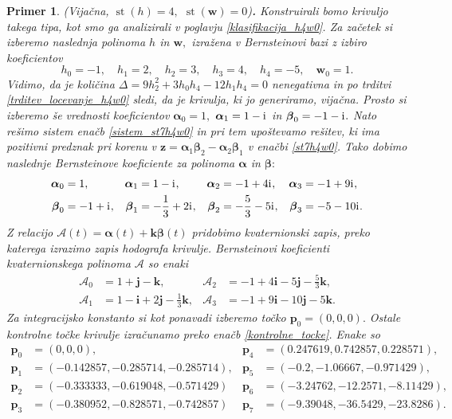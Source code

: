 \documentclass[12pt,a4paper,twoside]{article}
\newcommand{\iu}{\mathrm{i}\mkern1mu} %
\theoremstyle{definition} %
\theoremstyle{plain} %
\theoremstyle{primerstyle}
\newtheorem{primer}[definicija]{Primer}
\numberwithin{equation}{section}  %
\newcommand{\pV}{\mathbf{p}}
\newcommand{\iV}{\mathbf{i}}
\newcommand{\jV}{\mathbf{j}}
\newcommand{\kV}{\mathbf{k}}
\newcommand{\wV}{\mathbf{w}}
\newcommand{\zV}{\mathbf{z}}
\newcommand{\AQ}{\mathcal{A}}
\newcommand{\balpha}{\boldsymbol \alpha}
\newcommand{\bbeta}{\boldsymbol \beta}
\DeclareMathOperator{\st}{st}
\begin{document}
\begin{primer}
	\textnormal{ }(Vijačna, $\st(h)=4,$ $\st(\wV)=0$)\textbf{.}
	Konstruirali bomo krivuljo takega tipa, kot smo ga analizirali v poglavju \ref{klasifikacija_h4w0}. Za začetek si izberemo naslednja polinoma $h$ in $\wV,$ izražena v Bernsteinovi bazi z izbiro koeficientov
	\begin{equation*}
		h_0=-1,\quad h_1=2,\quad h_2=3,\quad h_3=4,\quad h_4=-5,\quad \wV_0=1.
	\end{equation*}
	Vidimo, da je količina $\Delta=9h_2^2+3h_0h_4-12h_1h_4=0$ nenegativna in po trditvi \ref{trditev_locevanje_h4w0} sledi, da je krivulja, ki jo generiramo, vijačna. Prosto si izberemo še vrednosti koeficientov $\balpha_0=1,$ $\balpha_1=1-\iu$ in $\bbeta_0=-1-\iu.$ Nato rešimo sistem enačb \eqref{sistem_st7h4w0} in pri tem upoštevamo rešitev, ki ima pozitivni predznak pri korenu v $\zV=\balpha_1\bbeta_2-\balpha_2\bbeta_1$ v enačbi \eqref{st7h4w0}. Tako dobimo naslednje Bernsteinove koeficiente za polinoma $\balpha$ in $\bbeta:$
	\begin{align*}
		\balpha_0&=1,&\balpha_1&=1-\iu,&\balpha_2&=-1+4\iu,&\balpha_3&=-1+9\iu,\\
		\bbeta_0&=-1+\iu,&\bbeta_1&=-\frac{1}{3}+2\iu,&\bbeta_2&=-\frac{5}{3}-5\iu,&\bbeta_3&=-5-10\iu.
	\end{align*}
	Z relacijo $\AQ(t)=\balpha(t)+\kV\bbeta(t)$ pridobimo kvaternionski zapis, preko katerega izrazimo zapis hodografa krivulje. Bernsteinovi koeficienti kvaternionskega polinoma $\AQ$ so enaki
	\begin{align*}
		\AQ_0&=1+\jV-\kV,&\AQ_2&=-1+4\iV-5\jV-\frac{5}{3}\kV,\\
		\AQ_1&=1-\iV+2\jV-\frac{1}{3}\kV,&\AQ_3&=-1+9\iV-10\jV-5\kV.
	\end{align*}
	Za integracijsko konstanto si kot ponavadi izberemo točko $\pV_0=(0,0,0).$ Ostale kontrolne točke krivulje izračunamo preko enačb \eqref{kontrolne_tocke}. Enake so
	\begin{align*}
		\pV_0&=(0,0,0),&\pV_4&=(0.247619, 0.742857, 0.228571),\\
		\pV_1&=(-0.142857, -0.285714, -0.285714),&\pV_5&=(-0.2, -1.06667, -0.971429),\\
		\pV_2&=(-0.333333, -0.619048, -0.571429)&\pV_6&=(-3.24762, -12.2571, -8.11429),\\
		\pV_3&=(-0.380952, -0.828571, -0.742857)&\pV_7&=(-9.39048, -36.5429, -23.8286).
	\end{align*}
	\begin{figure}[h]
	  \centering

\end{figure}
\end{primer}
\end{document}
